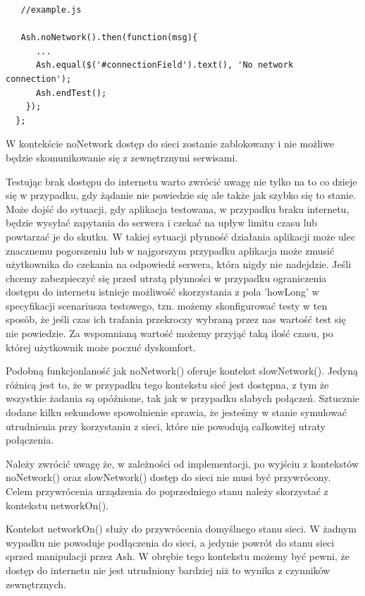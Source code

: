 \documentclass[brudnopis]{xmgr}
\begin{document}
\begin{lstlisting}
   //example.js

   Ash.noNetwork().then(function(msg){
      ...
      Ash.equal($('#connectionField').text(), 'No network connection');
      Ash.endTest();
    });
  };
\end{lstlisting}

W kontekście noNetwork dostęp do sieci zostanie zablokowany i nie możliwe będzie skomunikowanie się z zewnętrznymi serwisami.

Testując brak dostępu do internetu warto zwrócić uwagę nie tylko na to co dzieje się w przypadku, gdy żądanie nie powiedzie się ale także jak szybko się to stanie. Może dojść do sytuacji, gdy aplikacja testowana, w przypadku braku internetu, będzie wysyłać zapytania do serwera i czekać na upływ limitu czasu lub powtarzać je do skutku. W takiej sytuacji płynność działania aplikacji może ulec znacznemu pogorszeniu lub w najgorszym przypadku aplikacja może zmusić użytkownika do czekania na odpowiedź serwera, która nigdy nie nadejdzie. Jeśli chcemy zabezpieczyć się przed utratą płynności w przypadku ograniczenia dostępu do internetu istnieje możliwość skorzystania z pola 'howLong' w specyfikacji scenariusza testowego, tzn. możemy skonfigurować testy w ten sposób, że jeśli czas ich trafania przekroczy wybraną przez nas wartość test się nie powiedzie. Za wspomnianą wartość możemy przyjąć taką ilość czasu, po której użytkownik może poczuć dyskomfort. 

Podobną funkcjonlaność jak noNetwork() oferuje kontekst slowNetwork(). Jedyną różnicą jest to, że w przypadku tego kontekstu sieć jest dostępna, z tym że wszystkie żadania są opóźnione, tak jak w przypadku słabych połączeń. Sztucznie dodane kilku sekundowe spowolnienie sprawia, że jesteśmy w stanie symulować utrudnienia przy korzystaniu z sieci, które nie powodują całkowitej utraty połączenia. 

Należy zwrócić uwagę że, w zależności od implementacji, po wyjściu z kontekstów noNetwork() oraz slowNetwork() dostęp do sieci nie musi być przywrócony. Celem przywrócenia urządzenia do poprzedniego stanu należy skorzystać z kontekstu networkOn(). 

Kontekst networkOn() służy do przywrócenia domyślnego stanu sieci. W żadnym wypadku nie powoduje podłączenia do sieci, a jedynie powrót do stanu sieci sprzed manipulacji przez Ash. W obrębie tego kontekstu możemy być pewni, że dostęp do internetu nie jest utrudniony bardziej niż to wynika z czynników zewnętrznych. 
\end{document}
